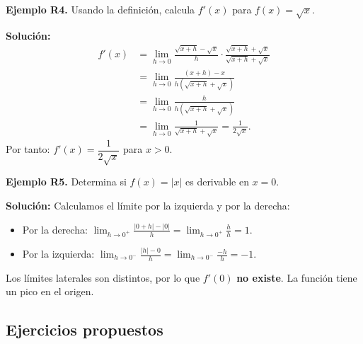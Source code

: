 \documentclass[12pt, letterpaper]{article}
\begin{document}
\textbf{Ejemplo R4.} Usando la definición, calcula $f'(x)$ para $f(x) = \sqrt{x}$.

\begin{cuadrosolucion}
  \textbf{Solución:}
  \begin{align*}
    f'(x) & = \lim_{h \to 0} \frac{\sqrt{x + h} - \sqrt{x}}{h} \cdot \frac{\sqrt{x + h} + \sqrt{x}}{\sqrt{x + h} + \sqrt{x}} \\
          & = \lim_{h \to 0} \frac{(x + h) - x}{h(\sqrt{x + h} + \sqrt{x})}                                                  \\
          & = \lim_{h \to 0} \frac{h}{h(\sqrt{x + h} + \sqrt{x})}                                                            \\
          & = \lim_{h \to 0} \frac{1}{\sqrt{x + h} + \sqrt{x}} = \frac{1}{2\sqrt{x}}.
  \end{align*}
  Por tanto: $f'(x) = \dfrac{1}{2\sqrt{x}}$ para $x > 0$.
\end{cuadrosolucion}

\textbf{Ejemplo R5.} Determina si $f(x) = |x|$ es derivable en $x = 0$.

\begin{cuadrosolucion}
  \textbf{Solución:} Calculamos el límite por la izquierda y por la derecha:
  \begin{itemize}
    \item Por la derecha: $\lim_{h \to 0^+} \frac{|0 + h| - |0|}{h} = \lim_{h \to 0^+} \frac{h}{h} = 1$.
    \item Por la izquierda: $\lim_{h \to 0^-} \frac{|h| - 0}{h} = \lim_{h \to 0^-} \frac{-h}{h} = -1$.
  \end{itemize}
  Los límites laterales son distintos, por lo que $f'(0)$ \textbf{no existe}. La función tiene un pico en el origen.
\end{cuadrosolucion}

\newpage

\subsection{Ejercicios propuestos}
\end{document}
